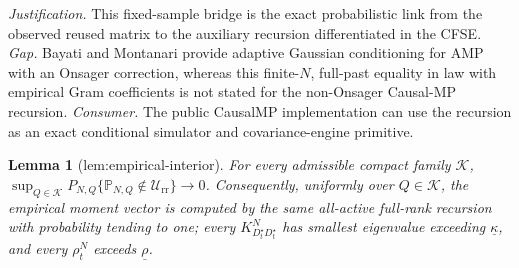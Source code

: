 \documentclass{article}
\newtheorem{lemma}{Lemma}
\begin{document}
\par\smallskip\noindent \textit{Justification.} This fixed-sample bridge is the exact probabilistic link from the observed reused matrix to the auxiliary recursion differentiated in the CFSE. \textit{Gap.} Bayati and Montanari provide adaptive Gaussian conditioning for AMP with an Onsager correction, whereas this finite-\(N\), full-past equality in law with empirical Gram coefficients is not stated for the non-Onsager Causal-MP recursion. \textit{Consumer.} The public CausalMP implementation can use the recursion as an exact conditional simulator and covariance-engine primitive.

\begin{lemma}[lem:empirical-interior]\label{lem:empirical-interior}
For every admissible compact family \(\mathcal K\), \(\sup_{Q\in\mathcal K}P_{N,Q}\{\mathbb P_{N,Q}\notin\mathcal U_{\mathrm{rr}}\}\to0\). Consequently, uniformly over \(Q\in\mathcal K\), the empirical moment vector is computed by the same all-active full-rank recursion with probability tending to one; every \(K_{D_t^{\star}D_t^{\star}}^{N}\) has smallest eigenvalue exceeding \(\underline\kappa\), and every \(\rho_t^{N}\) exceeds \(\underline\rho\).
\end{lemma}
\end{document}
